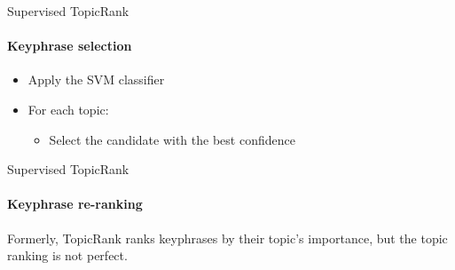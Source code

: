   \begin{frame}{Supervised TopicRank}
    \framesubtitle{Keyphrase selection}

    \begin{itemize}
      \item{Apply the SVM classifier}
      \item{For each topic:}
      \begin{itemize}
        \item{Select the candidate with the best confidence}
      \end{itemize}
    \end{itemize}
  \end{frame}

  \begin{frame}{Supervised TopicRank}
    \framesubtitle{Keyphrase re-ranking}

    Formerly, TopicRank ranks keyphrases by their topic's importance, but the
    topic ranking is not perfect.\\
  \end{frame}

%

